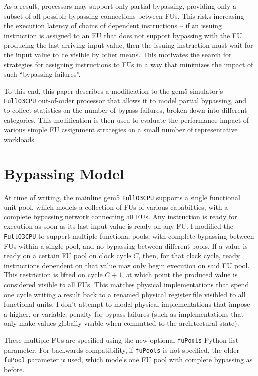 \documentclass[11pt]{article}
\begin{document}
As a result, processors may support only partial bypassing, providing
only a subset of all possible bypassing connections between FUs. This
risks increasing the execution latency of chains of dependent
instructions -- if an issuing instruction is assigned to an FU that
does not support bypassing with the FU producing the last-arriving
input value, then the issuing instruction must wait for the input
value to be visible by other means. This motivates the search for
strategies for assigning instructions to FUs in a way that minimizes
the impact of such ``bypassing failures''.

To this end, this paper describes a modification to the gem5
simulator's \texttt{FullO3CPU} out-of-order processor that allows it to
model partial bypassing, and to collect statistics on the number of
bypass failures, broken down into different categories. This
modification is then used to evaluate the performance impact of
various simple FU assignment strategies on a small number of
representative workloads.

\section{Bypassing Model}

At time of writing, the mainline gem5 \texttt{FullO3CPU} supports a
single functional unit pool, which models a collection of FUs of
various capabilities, with a complete bypassing network connecting all
FUs. Any instruction is ready for execution as soon as its last input
value is ready on any FU. I modified the \texttt{FullO3CPU} to support
multiple functional pools, with complete bypassing between FUs within a
single pool, and no bypassing between different pools. If a value is
ready on a certain FU pool on clock cycle $C$, then, for that clock
cycle, ready instructions dependent on that value may only begin
execution on said FU pool. This restriction is lifted on cycle $C+1$,
at which point the produced value is considered visible to all
FUs. This matches physical implementations that spend one cycle
writing a result back to a renamed physical register file visibled to
all functional units. I don't attempt to model physical
implementations that impose a higher, or variable, penalty for bypass
failures (such as implementations that only make values globally
visible when committed to the architectural state).

These multiple FUs are specified using the new optional
\texttt{fuPools} Python list parameter. For backwards-compatibility,
if \texttt{fuPools} is not specified, the older \texttt{fuPool}
parameter is used, which models one FU pool with complete bypassing as
before.
\end{document}
